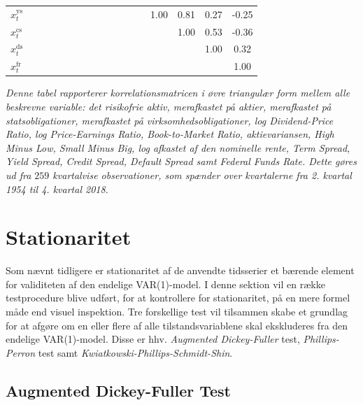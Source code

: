 \documentclass[
  a4paper,
  oneside]{memoir}
\begin{document}
\begin{table}[H]
{\begin{threeparttable}
\begin{tabular}[t]{lcccccccccccccccc}
\rowcolor{gray!6}  $x_t^{\text{ys}}$ &  &  &  &  &  &  &  &  &  &  &  &  & 1.00 & 0.81 & 0.27 & -0.25\\
$x_t^{\text{cs}}$ &  &  &  &  &  &  &  &  &  &  &  &  &  & 1.00 & 0.53 & -0.36\\
\rowcolor{gray!6}  $x_t^{\text{ds}}$ &  &  &  &  &  &  &  &  &  &  &  &  &  &  & 1.00 & 0.32\\
$x_t^{\text{fr}}$ &  &  &  &  &  &  &  &  &  &  &  &  &  &  &  & 1.00\\
\bottomrule
\end{tabular}
\begin{tablenotes}
\item \textit{Denne tabel rapporterer korrelationsmatricen i øvre triangulær form mellem alle beskrevne variable: det risikofrie aktiv, merafkastet på aktier, merafkastet på statsobligationer, merafkastet på virksomhedsobligationer, log Dividend-Price Ratio, log Price-Earnings Ratio, Book-to-Market Ratio, aktievariansen, High Minus Low, Small Minus Big, log afkastet af den nominelle rente, Term Spread, Yield Spread, Credit Spread, Default Spread samt Federal Funds Rate. Dette gøres ud fra $259$ kvartalvise observationer, som spænder over kvartalerne fra 2. kvartal 1954 til 4. kvartal 2018.}
\end{tablenotes}
\end{threeparttable}}
\end{table}

\hypertarget{stationar}{%
\section{Stationaritet}\label{stationar}}

Som nævnt tidligere er stationaritet af de anvendte tidsserier et bærende element for validiteten af den endelige VAR(1)-model. I denne sektion vil en række testprocedure blive udført, for at kontrollere for stationaritet, på en mere formel måde end visuel inspektion. Tre forskellige test vil tilsammen skabe et grundlag for at afgøre om en eller flere af alle tilstandsvariablene skal ekskluderes fra den endelige VAR(1)-model. Disse er hhv. \emph{Augmented Dickey-Fuller} test, \emph{Phillips-Perron} test samt \emph{Kwiatkowski-Phillips-Schmidt-Shin}.

\hypertarget{augdickful}{%
\subsection{Augmented Dickey-Fuller Test}\label{augdickful}}
\end{document}
